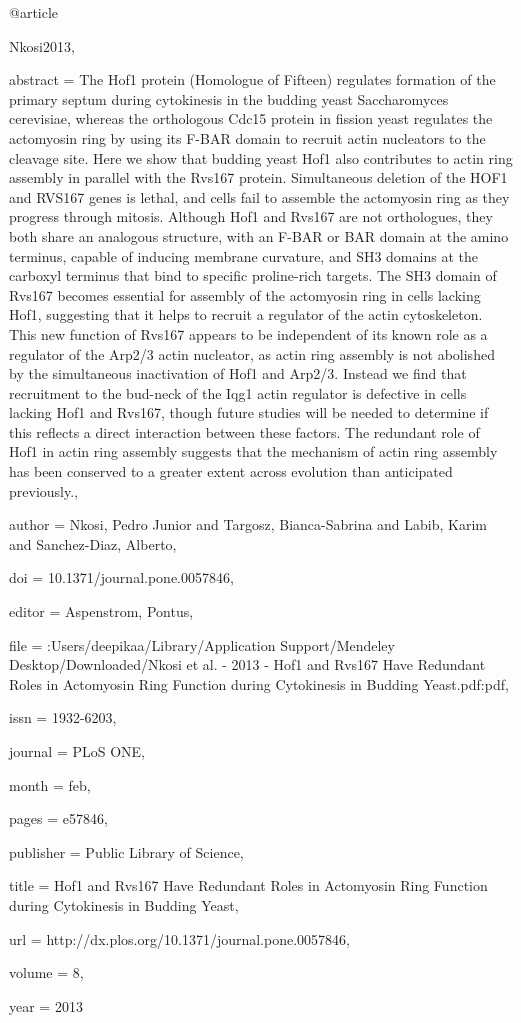 @article{Nkosi2013,

abstract = {The Hof1 protein (Homologue of Fifteen) regulates formation of the primary septum during cytokinesis in the budding yeast Saccharomyces cerevisiae, whereas the orthologous Cdc15 protein in fission yeast regulates the actomyosin ring by using its F-BAR domain to recruit actin nucleators to the cleavage site. Here we show that budding yeast Hof1 also contributes to actin ring assembly in parallel with the Rvs167 protein. Simultaneous deletion of the HOF1 and RVS167 genes is lethal, and cells fail to assemble the actomyosin ring as they progress through mitosis. Although Hof1 and Rvs167 are not orthologues, they both share an analogous structure, with an F-BAR or BAR domain at the amino terminus, capable of inducing membrane curvature, and SH3 domains at the carboxyl terminus that bind to specific proline-rich targets. The SH3 domain of Rvs167 becomes essential for assembly of the actomyosin ring in cells lacking Hof1, suggesting that it helps to recruit a regulator of the actin cytoskeleton. This new function of Rvs167 appears to be independent of its known role as a regulator of the Arp2/3 actin nucleator, as actin ring assembly is not abolished by the simultaneous inactivation of Hof1 and Arp2/3. Instead we find that recruitment to the bud-neck of the Iqg1 actin regulator is defective in cells lacking Hof1 and Rvs167, though future studies will be needed to determine if this reflects a direct interaction between these factors. The redundant role of Hof1 in actin ring assembly suggests that the mechanism of actin ring assembly has been conserved to a greater extent across evolution than anticipated previously.},

author = {Nkosi, Pedro Junior and Targosz, Bianca-Sabrina and Labib, Karim and Sanchez-Diaz, Alberto},

doi = {10.1371/journal.pone.0057846},

editor = {Aspenstrom, Pontus},

file = {:Users/deepikaa/Library/Application Support/Mendeley Desktop/Downloaded/Nkosi et al. - 2013 - Hof1 and Rvs167 Have Redundant Roles in Actomyosin Ring Function during Cytokinesis in Budding Yeast.pdf:pdf},

issn = {1932-6203},

journal = {PLoS ONE},

month = {feb},

pages = {e57846},

publisher = {Public Library of Science},

title = {{Hof1 and Rvs167 Have Redundant Roles in Actomyosin Ring Function during Cytokinesis in Budding Yeast}},

url = {http://dx.plos.org/10.1371/journal.pone.0057846},

volume = {8},

year = {2013}

}

